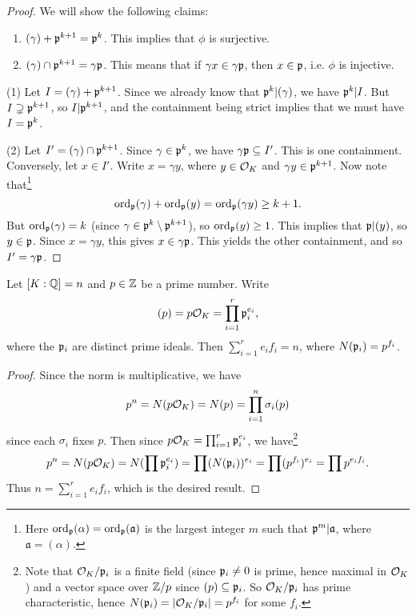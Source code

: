 \begin{proof}
  We will show the following claims:
  \begin{enumerate}
    \item $(\gamma) + \mathfrak{p}^{k + 1} = \mathfrak{p}^k$. This
      implies that $\phi$ is surjective.
    \item $(\gamma) \cap \mathfrak{p}^{k + 1} = \gamma \mathfrak{p}$.
      This means that if $\gamma x \in \gamma \mathfrak{p}$,
      then $x \in \mathfrak{p}$, i.e. $\phi$ is injective.
  \end{enumerate}
  (1) Let $I = (\gamma) + \mathfrak{p}^{k + 1}$. Since we already
  know that $\mathfrak{p}^k | (\gamma)$, we have $\mathfrak{p}^k | I$.
  But $I \supsetneq \mathfrak{p}^{k + 1}$, so $I | \mathfrak{p}^{k + 1}$,
  and the containment being strict implies that
  we must have $I = \mathfrak{p}^k$.

  (2) Let $I' = (\gamma) \cap \mathfrak{p}^{k + 1}$. Since
  $\gamma \in \mathfrak{p}^k$, we have $\gamma \mathfrak{p} \subseteq I'$.
  This is one containment.
  Conversely, let $x \in I'$. Write $x = \gamma y$,
  where $y \in \mathcal{O}_K$ and $\gamma y \in \mathfrak{p}^{k + 1}$.
  Now note that\footnote{Here $\operatorname{ord}_{\mathfrak{p}}(\alpha) = \operatorname{ord}_{\mathfrak{p}}(\mathfrak{a})$ is the largest integer $m$ such that $\mathfrak{p}^m | \mathfrak{a}$, where $\mathfrak{a} = (\alpha)$.}
  \[
    \operatorname{ord}_{\mathfrak{p}}(\gamma) + \operatorname{ord}_{\mathfrak{p}}(y) = \operatorname{ord}_{\mathfrak{p}}(\gamma y) \ge k + 1.
  \]
  But $\operatorname{ord}_{\mathfrak{p}}(\gamma) = k$ (since $\gamma \in \mathfrak{p}^k \setminus \mathfrak{p}^{k + 1}$),
  so $\operatorname{ord}_{\mathfrak{p}}(y) \ge 1$. This implies
  that $\mathfrak{p} | (y)$, so $y \in \mathfrak{p}$. Since
  $x = \gamma y$, this gives $x \in \gamma \mathfrak{p}$.
  This yields the other containment, and so
  $I' = \gamma \mathfrak{p}$.
\end{proof}

\begin{corollary}
  Let $[K : \mathbb{Q}] = n$ and $p \in \mathbb{Z}$ be a prime number.
  Write
  \[
    (p) = p\mathcal{O}_K = \prod_{i = 1}^r \mathfrak{p}_i^{e_i},
  \]
  where the $\mathfrak{p}_i$ are distinct prime ideals. Then
  $\sum_{i = 1}^r e_i f_i = n$,
  where $N(\mathfrak{p}_i) = p^{f_i}$.
\end{corollary}

\begin{proof}
  Since the norm is multiplicative, we have
  \[
    p^n = N(p \mathcal{O}_K) = N(p) = \prod_{i = 1}^n \sigma_i(p)
  \]
  since each $\sigma_i$ fixes $p$. Then since
  $p \mathcal{O}_K = \prod_{i = 1}^r \mathfrak{p}_i^{e_i}$, we have\footnote{Note that $\mathcal{O}_K / \mathfrak{p}_i$ is a finite field (since $\mathfrak{p}_i \ne 0$ is prime, hence maximal in $\mathcal{O}_K$) and a vector space over $\mathbb{Z} / p$ since $(p) \subseteq \mathfrak{p}_i$. So $\mathcal{O}_K / \mathfrak{p}_i$ has prime characteristic, hence $N(\mathfrak{p}_i) = |\mathcal{O}_K / \mathfrak{p}_i| = p^{f_i}$ for some $f_i$.}
  \[
    p^n = N(p \mathcal{O}_K) = N(\prod \mathfrak{p}_i^{e_i})
    = \prod (N(\mathfrak{p}_i))^{e_i}
    = \prod (p^{f_i})^{e_i}
    = \prod p^{e_i f_i}.
  \]
  Thus $n = \sum_{i = 1}^r e_i f_i$, which is the
  desired result.
\end{proof}

